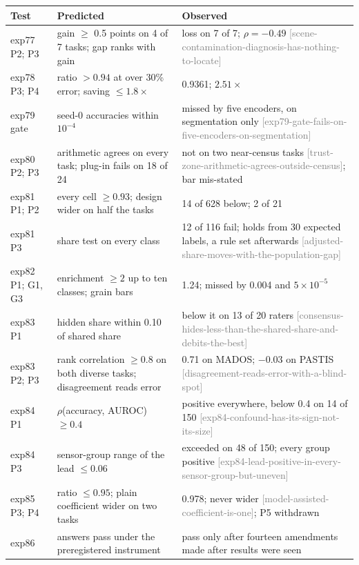 \documentclass[11pt,a4paper]{article}
\newcommand{\claim}[1]{{\scriptsize\textsf{\textcolor{gray}{[#1]}}}}
\begin{document}
\begin{table}[h]
\centering\footnotesize
\begin{tabularx}{\linewidth}{@{}lXX@{}}
\toprule
Test & Predicted & Observed \\
\midrule
exp77 P2; P3 & gain $\ge$ 0.5 points on 4 of 7 tasks; gap ranks with gain & loss on 7 of 7; $\rho = -0.49$ \claim{scene-contamination-diagnosis-has-nothing-to-locate} \\
exp78 P3; P4 & ratio $> 0.94$ at over 30\% error; saving $\le 1.8\times$ & 0.9361; $2.51\times$ \\
exp79 gate & seed-0 accuracies within $10^{-4}$ & missed by five encoders, on segmentation only \claim{exp79-gate-fails-on-five-encoders-on-segmentation} \\
exp80 P2; P3 & arithmetic agrees on every task; plug-in fails on 18 of 24 & not on two near-census tasks \claim{trust-zone-arithmetic-agrees-outside-census}; bar mis-stated \\
exp81 P1; P2 & every cell $\ge 0.93$; design wider on half the tasks & 14 of 628 below; 2 of 21 \\
exp81 P3 & share test on every class & 12 of 116 fail; holds from 30 expected labels, a rule set afterwards \claim{adjusted-share-moves-with-the-population-gap} \\
exp82 P1; G1, G3 & enrichment $\ge 2$ up to ten classes; grain bars & 1.24; missed by 0.004 and $5\times10^{-5}$ \\
exp83 P1 & hidden share within 0.10 of shared share & below it on 13 of 20 raters \claim{consensus-hides-less-than-the-shared-share-and-debits-the-best} \\
exp83 P2; P3 & rank correlation $\ge 0.8$ on both diverse tasks; disagreement reads error & 0.71 on MADOS; $-0.03$ on PASTIS \claim{disagreement-reads-error-with-a-blind-spot} \\
exp84 P1 & $\rho$(accuracy, AUROC) $\ge 0.4$ & positive everywhere, below 0.4 on 14 of 150 \claim{exp84-confound-has-its-sign-not-its-size} \\
exp84 P3 & sensor-group range of the lead $\le 0.06$ & exceeded on 48 of 150; every group positive \claim{exp84-lead-positive-in-every-sensor-group-but-uneven} \\
exp85 P3; P4 & ratio $\le 0.95$; plain coefficient wider on two tasks & 0.978; never wider \claim{model-assisted-coefficient-is-one}; P5 withdrawn \\
exp86 & answers pass under the preregistered instrument & pass only after fourteen amendments made after results were seen \\

\end{tabularx}
\end{table}
\end{document}

